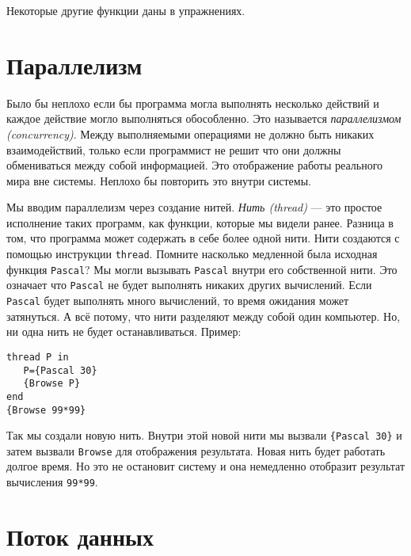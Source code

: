 Некоторые другие функции даны в упражнениях.

\section{Параллелизм}

Было бы неплохо если бы программа могла выполнять несколько действий и каждое действие могло выполняться обособленно. Это называется \emph{параллелизмом (concurrency)}. Между выполняемыми операциями не должно быть никаких взаимодействий, только если программист не решит что они должны обмениваться между собой информацией. Это отображение работы реального мира вне системы. Неплохо бы повторить это внутри системы.

Мы вводим параллелизм через создание нитей. \emph{Нить (thread)} --- это простое исполнение таких программ, как функции, которые мы видели ранее. Разница в том, что программа может содержать в себе более одной нити. Нити создаются с помощью инструкции \lstinline|thread|. Помните насколько медленной была исходная функция \lstinline|Pascal|? Мы могли вызывать \lstinline|Pascal| внутри его собственной нити. Это означает что \lstinline|Pascal| не будет выполнять никаких других вычислений. Если \lstinline|Pascal| будет выполнять много вычислений, то время ожидания может затянуться. А всё потому, что нити разделяют между собой один компьютер. Но, ни одна нить не будет останавливаться. Пример:

\begin{lstlisting}
thread P in
   P={Pascal 30}
   {Browse P}
end
{Browse 99*99}
\end{lstlisting}

Так мы создали новую нить. Внутри этой новой нити мы вызвали \lstinline|{Pascal 30}| и затем вызвали \lstinline|Browse| для отображения результата. Новая нить будет работать долгое время. Но это не остановит систему и она немедленно отобразит результат вычисления \lstinline|99*99|.

\section{Поток данных}

